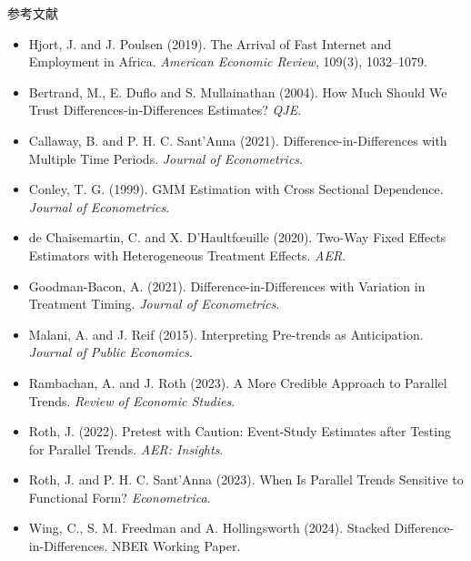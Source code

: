 \documentclass[aspectratio=169,11pt]{beamer}
\begin{document}
\begin{frame}{参考文献}
  \scriptsize
  \begin{itemize}
    \item Hjort, J. and J. Poulsen (2019). The Arrival of Fast Internet and Employment in Africa. \textit{American Economic Review}, 109(3), 1032--1079.
    \item Bertrand, M., E. Duflo and S. Mullainathan (2004). How Much Should We Trust Differences-in-Differences Estimates? \textit{QJE}.
    \item Callaway, B. and P. H. C. Sant'Anna (2021). Difference-in-Differences with Multiple Time Periods. \textit{Journal of Econometrics}.
    \item Conley, T. G. (1999). GMM Estimation with Cross Sectional Dependence. \textit{Journal of Econometrics}.
    \item de Chaisemartin, C. and X. D'Haultfœuille (2020). Two-Way Fixed Effects Estimators with Heterogeneous Treatment Effects. \textit{AER}.
    \item Goodman-Bacon, A. (2021). Difference-in-Differences with Variation in Treatment Timing. \textit{Journal of Econometrics}.
    \item Malani, A. and J. Reif (2015). Interpreting Pre-trends as Anticipation. \textit{Journal of Public Economics}.
    \item Rambachan, A. and J. Roth (2023). A More Credible Approach to Parallel Trends. \textit{Review of Economic Studies}.
    \item Roth, J. (2022). Pretest with Caution: Event-Study Estimates after Testing for Parallel Trends. \textit{AER: Insights}.
    \item Roth, J. and P. H. C. Sant'Anna (2023). When Is Parallel Trends Sensitive to Functional Form? \textit{Econometrica}.
    \item Wing, C., S. M. Freedman and A. Hollingsworth (2024). Stacked Difference-in-Differences. NBER Working Paper.
  \end{itemize}
\end{frame}
\end{document}
